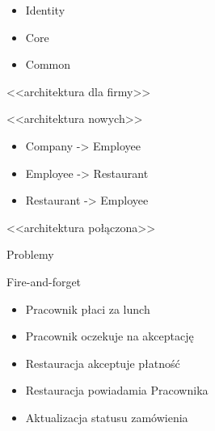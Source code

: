 \documentclass{beamer}
\begin{document}
\begin{frame}{}
	\begin{huge}
		\begin{itemize}[<+->]
			\item Identity
			\item Core
			\item Common
		\end{itemize}
	\end{huge}
\end{frame}

\begin{frame}{}
	\begin{center}
		\huge{<<architektura dla firmy>>}
	\end{center}
\end{frame}

\begin{frame}{}
	\begin{center}
		\huge{<<architektura nowych>>}
	\end{center}
\end{frame}

\begin{frame}{}
	\begin{huge}
		\begin{itemize}[<+->]
			\item Company -> Employee
			\item Employee -> Restaurant
			\item Restaurant -> Employee
		\end{itemize}
	\end{huge}
\end{frame}

\begin{frame}{}
	\begin{center}
		\huge{<<architektura połączona>>}
	\end{center}
\end{frame}

\begin{frame}{}
	\begin{center}
		\huge{Problemy}
	\end{center}
\end{frame}

\begin{frame}{}
	\begin{center}
		\huge{Fire-and-forget}
	\end{center}
\end{frame}

\begin{frame}{}
	\begin{Large}
		\begin{itemize}[<+->]
			\item Pracownik płaci za lunch
			\item Pracownik oczekuje na akceptację
			\item Restauracja akceptuje płatność
			\item Restauracja powiadamia Pracownika
			\item Aktualizacja statusu zamówienia
		\end{itemize}
	\end{Large}
\end{frame}
\end{document}
